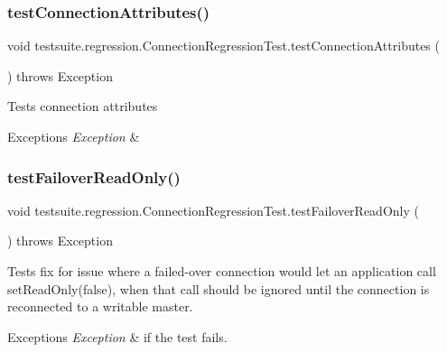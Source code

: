 \subsubsection{\texorpdfstring{test\+Connection\+Attributes()}{testConnectionAttributes()}}
{\footnotesize\ttfamily void testsuite.\+regression.\+Connection\+Regression\+Test.\+test\+Connection\+Attributes (\begin{DoxyParamCaption}{ }\end{DoxyParamCaption}) throws Exception}

Tests connection attributes


\begin{DoxyExceptions}{Exceptions}
{\em Exception} & \\
\hline
\end{DoxyExceptions}
\mbox{\label{classtestsuite_1_1regression_1_1_connection_regression_test_a9b67a76ffbc55986621776106705e212}} 
\subsubsection{\texorpdfstring{test\+Failover\+Read\+Only()}{testFailoverReadOnly()}}
{\footnotesize\ttfamily void testsuite.\+regression.\+Connection\+Regression\+Test.\+test\+Failover\+Read\+Only (\begin{DoxyParamCaption}{ }\end{DoxyParamCaption}) throws Exception}

Tests fix for issue where a failed-\/over connection would let an application call set\+Read\+Only(false), when that call should be ignored until the connection is reconnected to a writable master.


\begin{DoxyExceptions}{Exceptions}
{\em Exception} & if the test fails. \\
\hline
\end{DoxyExceptions}
\mbox{\label{classtestsuite_1_1regression_1_1_connection_regression_test_a1f2f79b3fda5cc037b1fa079164289a5}} 
